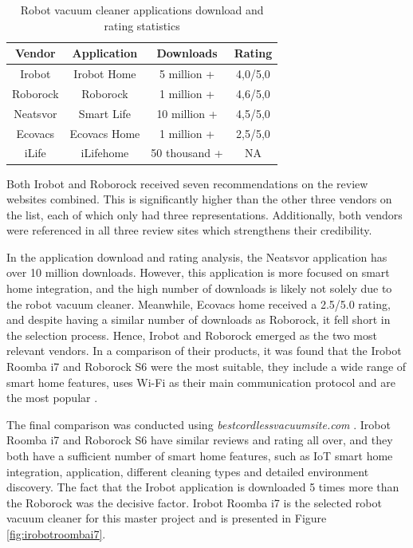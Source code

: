\begin{table}[H]
\centering
\caption{Robot vacuum cleaner applications download and rating statistics}
\label{tab:VendorApplicationStat}
\begin{tabular}{|c|c|c|c|}
\hline
\textbf{Vendor} & \textbf{Application} & \textbf{Downloads} & \textbf{Rating} \\ \hline
Irobot          & Irobot Home          & 5 million +        & 4,0/5,0         \\ \hline
Roborock        & Roborock             & 1 million +        & 4,6/5,0         \\ \hline
Neatsvor        & Smart Life           & 10 million +       & 4,5/5,0         \\ \hline
Ecovacs         & Ecovacs Home         & 1 million +        & 2,5/5,0         \\ \hline
iLife           & iLifehome            & 50 thousand +      & NA              \\ \hline
\end{tabular}
\end{table}
Both Irobot and Roborock received seven recommendations on the review websites combined. This is significantly higher than the other three vendors on the list, each of which only had three representations. Additionally, both vendors were referenced in all three review sites which strengthens their credibility. 

In the application download and rating analysis, the Neatsvor application has over 10 million downloads. However, this application is more focused on smart home integration, and the high number of downloads is likely not solely due to the robot vacuum cleaner. Meanwhile, Ecovacs home received a 2.5/5.0 rating, and despite having a similar number of downloads as Roborock, it fell short in the selection process. Hence, Irobot and Roborock emerged as the two most relevant vendors. In a comparison of their products, it was found that the Irobot Roomba i7 and Roborock S6 were the most suitable, they include a wide range of smart home features, uses Wi-Fi as their main communication protocol and are the most popular \cite{robotsel8} \cite{robotsel6}. 

The final comparison was conducted using \textit{bestcordlessvacuumsite.com} \cite{robotsel9}. Irobot Roomba i7 and Roborock S6 have similar reviews and rating all over, and they both have a sufficient number of smart home features, such as IoT smart home integration, application, different cleaning types and detailed environment discovery. The fact that the Irobot application is downloaded 5 times more than the Roborock was the decisive factor. Irobot Roomba i7 is the selected robot vacuum cleaner for this master project and is presented in Figure \ref{fig:irobotroombai7}. 

